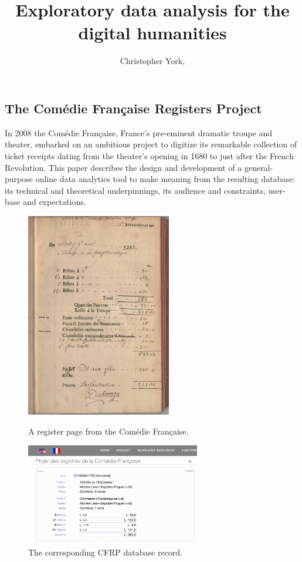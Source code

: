 \documentclass[	DIV=calc,%
							paper=a4,%
							fontsize=11pt,%
							twocolumn]{scrartcl}	 					%
\title{Exploratory data analysis for the digital humanities}					%
\author{Christopher York, }										%
\date{}																				%
\begin{document}
\maketitle
\thispagestyle{fancy} 			%

\subsection*{The Comédie Française Registers Project}

In 2008 the Comédie Française, France's pre-eminent dramatic troupe and theater, embarked on an ambitious project to digitize its remarkable collection of ticket receipts dating from the theater's opening in 1680 to just after the French Revolution.  This paper describes the design and development of a general-purpose online data analytics tool to make meaning from the resulting database: its technical and theoretical underpinnings, its audience and constraints, user-base and expectations.

\begin{figure}
  \centering
  \includegraphics[width=2.5in]{steps/register-example.jpg}
	\caption{A register page from the Comédie Française.}
  \label{fig:register_example}
  \includegraphics[width=3in]{steps/register-example-digital.png}
	\caption{The corresponding CFRP database record.}
  \label{fig:register_example_digital}
\end{figure}
\end{document}
